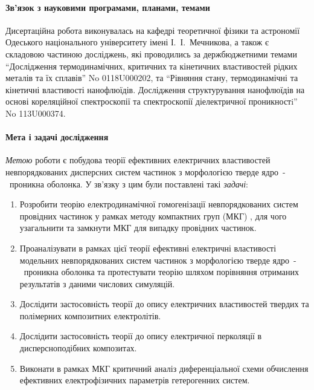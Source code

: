 \paragraph{Зв'язок з науковими програмами, планами, темами}\hfill\par
Дисертаційна робота виконувалась на кафедрі теоретичної фізики та 
астрономії Одеського національного університету імені І.~І.~Мечникова, 
а також є складовою частиною досліджень, які проводились
за держбюджетними темами ``Дослідження термодинамічних, критичних та 
кінетичних властивостей рідких металів та їх сплавів'' No 0118U000202, та ``Рівняння стану, термодинамічні та 
кінетичні властивості нанофлюїдів. Дослідження структурування 
нанофлюїдів на основі кореляційної спектроскопії та спектроскопії 
діелектричної проникностi'' No 113U000374.


\paragraph{Мета і задачі дослідження}\hfill\par
\textit{Метою} роботи є побудова теорії ефективних електричних 
властивостей невпорядкованих дисперсних систем частинок з 
морфологією тверде ядро~-~проникна оболонка. У зв’язку з цим 
були поставлені такі \textit{задачі}:

\begin{enumerate}
\item
Розробити теорію електродинамічної гомогенізації невпорядкованих 
систем провідних частинок у рамках методу компактних груп 
(МКГ) \cite{Sushko2007, Sushko2009, SushkoJPD2009, Sushko2017}, 
для чого узагальнити та замкнути МКГ для випадку провідних 
частинок.
\item
Проаналізувати в рамках цієї теорії ефективні електричні 
властивості модельних невпорядкованих систем частинок з морфологією 
тверде ядро~-~проникна оболонка та протестувати теорію шляхом 
порівняння отриманих результатів з даними числових 
симуляцій.
\item
Дослідити застосовність теорії до опису електричних 
властивостей твердих та полімерних композитних 
електролітів.
\item
Дослідити застосовність теорії до опису електричної 
перколяції в дисперсноподібних композитах. 
\item
Виконати в рамках МКГ критичний аналіз диференціальної схеми 
обчислення ефективних електрофізичних параметрів 
гетерогенних систем.
\end{enumerate}


